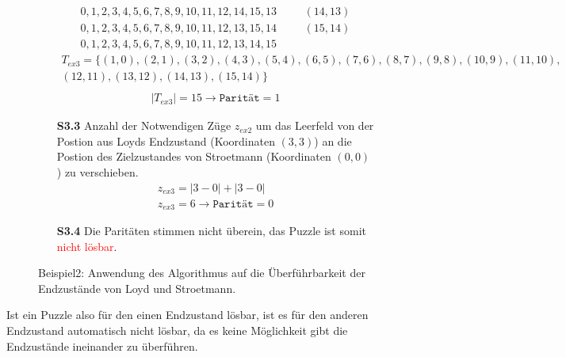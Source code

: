 \begin{figure}[H]
\begin{enumerate}
\begin{align*}
			      0,1,2,3,4,5,6,7,8,9,10,11,12,14,15,13 & \hspace{20pt} (14,13) \\
			      0,1,2,3,4,5,6,7,8,9,10,11,12,13,15,14 & \hspace{20pt} (15,14) \\
			      0,1,2,3,4,5,6,7,8,9,10,11,12,13,14,15
		      \end{align*}
		      \begin{align*}
			      T_{ex3} = \{(1,0),(2,1),(3,2),(4,3),(5,4),(6,5),(7,6),(8,7),(9,8),(10,9),(11,10), \\(12,11),(13,12),(14,13),(15,14)\}\\
		      \end{align*}
		      \begin{align*}
			      \left\vert T_{ex3}\right\vert = 15 \rightarrow \texttt{Parität} = 1
		      \end{align*}
		\item[\textbf{S3.3}] Anzahl der Notwendigen Züge $z_{ex2}$ um das Leerfeld von der Postion aus Loyds Endzustand (Koordinaten $(3,3)$) an die Postion des Zielzustandes von Stroetmann (Koordinaten $(0,0)$) zu verschieben.
		      \begin{align*}
			      z_{ex3} = \left | 3 - 0 \right | + \left | 3 - 0 \right | \\
			      z_{ex3} = 6 \rightarrow \texttt{Parität} = 0
		      \end{align*}
		\item[\textbf{S3.4}] Die Paritäten stimmen nicht überein, das Puzzle ist somit \textcolor{red}{nicht lösbar}.
	\end{enumerate}
	\caption{Beispiel2: Anwendung des Algorithmus auf die Überführbarkeit der Endzustände von Loyd und Stroetmann. \label{fig:Ex3_algo}}
\end{figure}
Ist ein Puzzle also für den einen Endzustand lösbar, ist es für den anderen Endzustand automatisch nicht lösbar, da es keine Möglichkeit gibt die Endzustände ineinander zu überführen.

